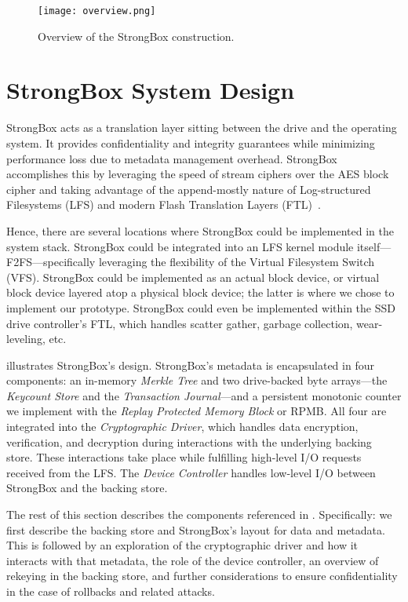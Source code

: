 \begin{figure}[t]
 \centering
  \texttt{[image: overview.png]}
   \caption{Overview of the StrongBox construction.}\label{fig:overview}
\end{figure}

\section{StrongBox System Design}\label{sec:design}

StrongBox acts as a translation layer sitting between the drive and the
operating system. It provides confidentiality and integrity guarantees while
minimizing performance loss due to metadata management overhead. StrongBox
accomplishes this by leveraging the speed of stream ciphers over the AES block
cipher and taking advantage of the append-mostly nature of Log-structured
Filesystems (LFS) and modern Flash Translation Layers (FTL)~\cite{SSD}.

Hence, there are several locations where StrongBox could be implemented in the
system stack. StrongBox could be integrated into an LFS kernel module
itself---\eg F2FS---specifically leveraging the flexibility of the Virtual
Filesystem Switch (VFS). StrongBox could be implemented as an actual block
device, or virtual block device layered atop a physical block device; the latter
is where we chose to implement our prototype. StrongBox could even be
implemented within the SSD drive controller's FTL, which handles scatter gather,
garbage collection, wear-leveling, etc.

 illustrates StrongBox's design. StrongBox's metadata is
encapsulated in four components: an in-memory \emph{Merkle Tree} and two
drive-backed byte arrays---the \emph{Keycount Store} and the \emph{Transaction
Journal}---and a persistent monotonic counter we implement with the \emph{Replay
Protected Memory Block} or RPMB. All four are integrated into the
\emph{Cryptographic Driver}, which handles data encryption, verification, and
decryption during interactions with the underlying backing store. These
interactions take place while fulfilling high-level I/O requests received from
the LFS. The \emph{Device Controller} handles low-level I/O between
StrongBox and the backing store.

The rest of this section describes the components referenced in
. Specifically: we first describe the backing store and
StrongBox's layout for data and metadata. This is followed by an exploration of
the cryptographic driver and how it interacts with that metadata, the role of
the device controller, an overview of rekeying in the backing store, and further
considerations to ensure confidentiality in the case of rollbacks and related
attacks.

